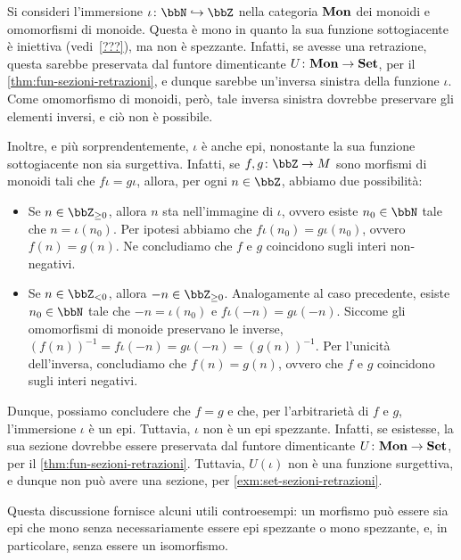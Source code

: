 \begin{example}
	Si consideri l'immersione \(\iota \colon \bbN \mono \bbZ\)
	nella categoria \(\mathbf{Mon}\) dei monoidi e omomorfismi di monoide.
	Questa è mono in quanto la sua funzione sottogiacente è iniettiva (vedi~\ref{???}),
	ma non è spezzante.
	Infatti, se avesse una retrazione,
	questa sarebbe preservata dal funtore dimenticante \(U \colon \mathbf{Mon} \to \mathbf{Set}\),
	per il \autoref{thm:fun-sezioni-retrazioni},
	e dunque sarebbe un'inversa sinistra della funzione \(\iota\).
	Come omomorfismo di monoidi, però, tale inversa sinistra dovrebbe preservare gli elementi inversi,
	e ciò non è possibile.

	Inoltre, e più sorprendentemente, \(\iota\) è anche epi,
	nonostante la sua funzione sottogiacente non sia surgettiva.
	Infatti, se \(f, g \colon \bbZ \to M\) sono morfismi di monoidi tali che \(f \iota = g \iota\),
	allora, per ogni \(n \in \bbZ\),
	abbiamo due possibilità:
	\begin{itemize}
		\item Se \(n \in \bbZ_{\geq 0}\), allora \(n\) sta nell'immagine di \(\iota\),
		 	ovvero esiste \(n_0 \in \bbN\) tale che \(n = \iota(n_0)\).
			Per ipotesi abbiamo che \(f \iota (n_0) = g \iota (n_0)\),
			ovvero \(f (n) = g (n)\).
			Ne concludiamo che \(f\) e \(g\) coincidono sugli interi non-negativi.
		\item Se \(n \in \bbZ_{< 0}\), allora \(-n \in \bbZ_{\geq 0}\).
			Analogamente al caso precedente, esiste \(n_0 \in \bbN\) tale che
			\(-n = \iota(n_0)\) e \(f \iota (-n) = g \iota (-n)\).
			Siccome gli omomorfismi di monoide preservano le inverse,
			\({(f (n))}^{-1} = f \iota {(-n)} = g \iota {(-n)} = {(g (n))}^{-1}\).
			Per l'unicità dell'inversa, concludiamo che \(f (n) = g (n)\),
			ovvero che \(f\) e \(g\) coincidono sugli interi negativi.
	\end{itemize}
	Dunque, possiamo concludere che \(f = g\)
	e che, per l'arbitrarietà di \(f\) e \(g\),
	l'immersione \(\iota\) è un epi.
	Tuttavia, \(\iota\) non è un epi spezzante.
	Infatti, se esistesse, la sua sezione dovrebbe essere preservata dal funtore dimenticante \(U \colon \mathbf{Mon} \to \mathbf{Set}\),
	per il \autoref{thm:fun-sezioni-retrazioni}.
	Tuttavia, \(U(\iota)\) non è una funzione surgettiva,
	e dunque non può avere una sezione, per \autoref{exm:set-sezioni-retrazioni}.

	Questa discussione fornisce alcuni utili controesempi:
	un morfismo può essere sia epi che mono senza necessariamente essere epi spezzante o mono spezzante,
	e, in particolare, senza essere un isomorfismo.
\end{example}
